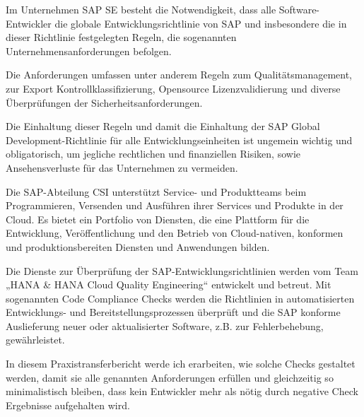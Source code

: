 \documentclass[../main.tex]{subfiles}
\begin{document}
Im Unternehmen SAP SE besteht die Notwendigkeit, dass alle Software-Entwickler die globale Entwicklungsrichtlinie von SAP und insbesondere die in dieser Richtlinie festgelegten Regeln, die sogenannten Unternehmensanforderungen befolgen.

Die Anforderungen umfassen unter anderem Regeln zum Qualitätsmanagement, zur Export Kontrollklassifizierung, Opensource Lizenzvalidierung und diverse Überprüfungen der Sicherheitsanforderungen.

Die Einhaltung dieser Regeln und damit die Einhaltung der SAP Global Development-Richtlinie für alle Entwicklungseinheiten ist ungemein wichtig und obligatorisch, um jegliche rechtlichen und finanziellen Risiken, sowie Ansehensverluste für das Unternehmen zu vermeiden.

Die SAP-Abteilung \gls{CSI} unterstützt Service- und Produktteams beim Programmieren, Versenden und Ausführen ihrer Services und Produkte in der Cloud.
Es bietet ein Portfolio von Diensten, die eine Plattform für die Entwicklung, Veröffentlichung und den Betrieb von Cloud-nativen, konformen und produktionsbereiten Diensten und Anwendungen bilden.

Die Dienste zur Überprüfung der SAP-Entwicklungsrichtlinien werden vom Team „HANA \& HANA Cloud Quality Engineering“ entwickelt und betreut.
Mit sogenannten Code Compliance Checks werden die Richtlinien in automatisierten Entwicklungs- und Bereitstellungsprozessen überprüft und die SAP konforme Auslieferung neuer oder aktualisierter Software, z.B. zur Fehlerbehebung, gewährleistet. 

In diesem Praxistransferbericht werde ich erarbeiten, wie solche Checks gestaltet werden, damit sie alle genannten Anforderungen erfüllen und gleichzeitig so minimalistisch bleiben, dass kein Entwickler mehr als nötig durch negative Check Ergebnisse aufgehalten wird. 
\end{document}
